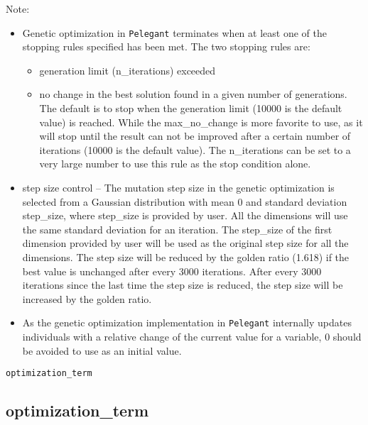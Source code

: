 \documentclass[11pt]{article}
\begin{document}
Note:
\begin{itemize}
\item Genetic optimization in {\tt Pelegant} terminates when at least one of the stopping rules specified has been met. 
The two stopping rules are: 

\begin{itemize}
\item generation limit (n\_iterations) exceeded
\item no change in the best solution found in a given number of generations. 
The default is to stop when the generation limit (10000 is the default value) is reached. While the max\_no\_change is more favorite to use, as it will stop until the result can not be improved after a certain number of iterations (10000 is the default value). The n\_iterations can be set 
to a very large number to use this rule as the stop condition alone.
\end{itemize}

\item step size control -- The mutation step size in the genetic optimization is selected from a Gaussian distribution with mean 0 and standard deviation step\_size, where step\_size is provided by user. All the dimensions will use the same standard deviation for an iteration. The step\_size of the first dimension provided by user will be used as the original step size for all the dimensions. The step size will be reduced by the golden ratio (1.618) if the best value is unchanged after every 3000 iterations. After every 3000 iterations since the last time the step size is reduced, the step size will be increased by the golden ratio.

\item As the genetic optimization implementation in {\tt Pelegant} internally updates individuals with a relative change of the current value for a variable, 0 should be avoided to use as an initial value.

\end{itemize}

\begin{latexonly}
\newpage
\begin{center}{\Large\verb|optimization_term|}\end{center}
\end{latexonly}
\subsection{optimization\_term \label{subsec:optimizationterm}}
\end{document}
